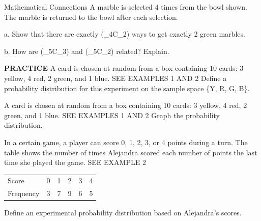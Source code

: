 \documentclass{article}
\newenvironment{practice}[2]{}{}        %
\newcommand{\answer}[1]{}               %
\newcommand{\placeholder}[2]{}          %
\newcommand{\te}[1]{}                   %
\begin{document}
\begin{practice}{15}{3}
Mathematical Connections A marble is selected 4 times from the bowl shown. The marble is returned to the bowl after each selection.
\placeholder{illustration}{Transparent bowl on wood surface with three green G marbles and two yellow Y marbles.}
a. Show that there are exactly ({}_4C_2) ways to get exactly 2 green marbles.
\answer{a. Sample: There are 6 ways to select 2 green marbles in 4 trials: GGRR, GRGR, GRRG, RGGR, RGRG, RRGG. That is, there are ({}_4C_2=6) ways to choose 2 things out of 4.}
\te{Printed R in outcomes while the non-green marbles are yellow Y.}
b. How are ({}_5C_3) and ({}_5C_2) related? Explain.
\answer{b. ({}_5C_3={}_5C_2); choosing 3 out of 5 items is the same as not choosing those 3 items from the 5 items, or choosing 2 out of the remaining 5 items.}
\te{Printed remaining 5 items; likely the original 5 items.}
\end{practice}
\begin{practice}{16}{1}
\textbf{PRACTICE} A card is chosen at random from a box containing 10 cards: 3 yellow, 4 red, 2 green, and 1 blue. SEE EXAMPLES 1 AND 2
Define a probability distribution for this experiment on the sample space \{Y, R, G, B\}.
\answer{Let P be the function defined on the set \{Y, R, G, B\} such that (P(Y)=0.3), (P(R)=0.4), (P(G)=0.2), and (P(B)=0.1).}
\end{practice}
\begin{practice}{17}{1}
A card is chosen at random from a box containing 10 cards: 3 yellow, 4 red, 2 green, and 1 blue. SEE EXAMPLES 1 AND 2
Graph the probability distribution.
\answer{See graph.}
\placeholder{graph}{Practice 17 answer: adjacent orange black-bordered bars at Color Y,R,G,B with heights .3,.4,.2,.1. Vertical Probability 0.0-.5 by .1, pale background and dotted grid, no arrows.}
\end{practice}
\begin{practice}{18}{1}
In a certain game, a player can score 0, 1, 2, 3, or 4 points during a turn. The table shows the number of times Alejandra scored each number of points the last time she played the game. SEE EXAMPLE 2
\begin{tabular}{llllll}
Score & 0 & 1 & 2 & 3 & 4 \\
Frequency & 3 & 7 & 9 & 6 & 5 \\
\end{tabular}
Define an experimental probability distribution based on Alejandra's scores.
\answer{Let P be the function defined on the set \{0, 1, 2, 3, 4\} such that (P(0)\ \frac1{10}), (P(1)=\frac7{30}), (P(2)=\frac3{10}), (P(3)=\frac15), and (P(4)=\frac16).}
\te{Printed first equality sign omitted between P(0) and 1/10.}
\end{practice}
\end{document}
